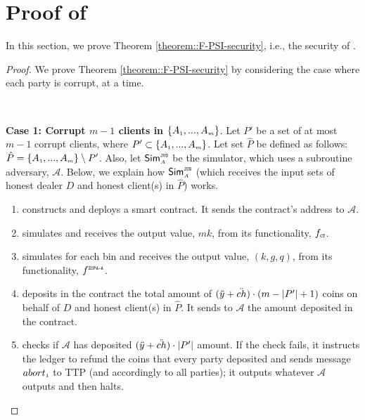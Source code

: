 

\section{Proof of \fpsi}\label{sec::F-PSI-proof}



In this section, we prove Theorem \ref{theorem::F-PSI-security}, i.e., the security of \fpsi. 


\begin{proof}
%
We prove Theorem  \ref{theorem::F-PSI-security} by considering the case where each party is corrupt, at a time.

\

\noindent\textbf{Case 1: Corrupt $m-1$ clients in $\{  {  A}_{ \scriptscriptstyle {   1}}, ...,   {  A}_{ \scriptscriptstyle {   m}}\}$}.  Let $P'$ be a set of at most $m-1$ corrupt clients, where $P'\subset \{  {  A}_{ \scriptscriptstyle {   1}}, ...,   {  A}_{ \scriptscriptstyle {   m}}\}$. Let set $\hat P$ be defined as follows: $\hat P=\{  {  A}_{ \scriptscriptstyle {   1}}, ...,   {  A}_{ \scriptscriptstyle {   m}}\}\setminus P'$. Also, let $\mathsf{Sim}^{\scriptscriptstyle\mathtt{JUS}}_{\scriptscriptstyle A}$ be the simulator, which uses a subroutine adversary, $\mathcal{A}$.  Below, we explain how $\mathsf{Sim}^{\scriptscriptstyle \mathtt{JUS}}_{\scriptscriptstyle A}$ (which receives the input sets of honest dealer $D$ and honest client(s) in $\hat P$) works. 


\begin{enumerate}
%
\item constructs and deploys a smart contract. It sends the contract's address to $\mathcal{A}$. 
%
\item simulates \ct and receives the output value, $ {mk}$, from its functionality, $f_{\scriptscriptstyle \mathtt{CT}}$.
%
\item\label{sim::ZSPA-A-invocation} simulates \zspaa for each bin and receives the output value, $( k,  g,  q)$, from its functionality, $f^{\scriptscriptstyle \mathtt{ZSPA\text{-}A}}$.
%
\item deposits in the contract the total amount of $(\ddot{y}+\ddot{ch})\cdot (m-|P'|+1)$ coins on behalf of $D$ and honest client(s) in $\hat P$. It sends to $\mathcal{A}$ the amount deposited in the contract. 
%
\item checks if $\mathcal{A}$ has deposited $(\ddot{y}+\ddot{ch})\cdot |P'|$ amount. If the check fails, it instructs the ledger to refund the coins that every party deposited and sends message $abort_{\scriptscriptstyle 1}$ to TTP (and accordingly to all parties); it outputs whatever $\mathcal{A}$ outputs and then halts. 


\end{enumerate}
\end{proof}
